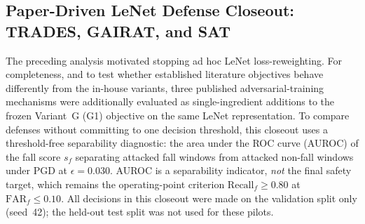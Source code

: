 %
%


\subsection{Paper-Driven LeNet Defense Closeout: TRADES, GAIRAT, and SAT}
\label{subsec:ch6-paper-driven-closeout}

The preceding analysis motivated stopping ad hoc LeNet loss-reweighting. For completeness, and to test
whether established literature objectives behave differently from the in-house variants, three
published adversarial-training mechanisms were additionally evaluated as single-ingredient additions to
the frozen Variant~G (G1) objective on the same LeNet representation. To compare defenses without
committing to one decision threshold, this closeout uses a threshold-free separability diagnostic: the
area under the ROC curve (AUROC) of the fall score \(s_f\) separating attacked fall windows from attacked
non-fall windows under PGD at \(\epsilon=0.030\). AUROC is a separability indicator, \emph{not} the final
safety target, which remains the operating-point criterion \(\mathrm{Recall}_f\geq 0.80\) at
\(\mathrm{FAR}_f\leq 0.10\). All decisions in this closeout were made on the validation split only (seed~42);
the held-out test split was not used for these pilots.

